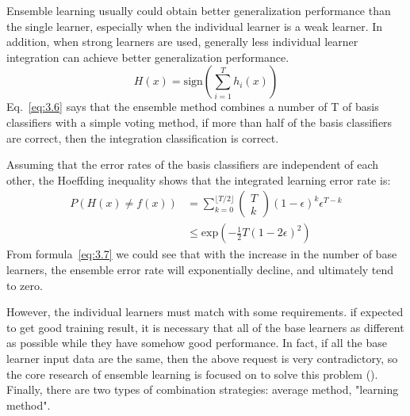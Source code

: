 \documentclass[master]{IPSstyle}
\begin{document}
{Ensemble learning usually could obtain better generalization performance than the single learner, especially when the individual learner is a weak learner. In addition, when strong learners are used, generally less individual learner integration can achieve better generalization performance.
\begin{equation} \label{eq:3.6}
H(x) =\mathrm{sign} \left(\sum_{i=1}^Th_i(x)\right)
\end{equation}
Eq.~\ref{eq:3.6} says that the ensemble method combines a number of T of basis classifiers with a simple voting method, if more than half of the basis classifiers are correct, then the integration classification is correct.

Assuming that the error rates of the basis classifiers are independent of each other, the Hoeffding inequality shows that the integrated learning error rate is:
\begin{equation} \label{eq:3.7}
\begin{aligned}
P(H(x)  \neq f(x)) &= \sum_{k=0}^{\lfloor T/2 \rfloor}
\left(\!\begin{array}{c}
T \\ k
\end{array}
\!\right)
(1-\epsilon)^k\epsilon^{T-k} \\
& \leq \mathrm{exp}\left(-\frac{1}{2}T(1-2\epsilon)^2\right)
\end{aligned}
\end{equation}
From formula~\ref{eq:3.7} we could see that with the increase in the number of base learners, the ensemble error rate will exponentially decline, and ultimately tend to zero.

However, the individual learners must match with some requirements. if expected to get good training result, it is necessary that all of the base learners as different as possible while they have somehow good performance. In fact, if all the base learner input data are the same, then the above request is very contradictory, so the core research of ensemble learning is focused on to solve this problem (\cite{krogh1995neural,breiman1996bagging,kohavi1996bias}). Finally, there are two types of combination strategies: average method, "learning method".

}
\end{document}
